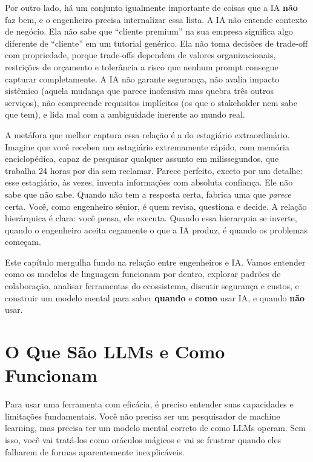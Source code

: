 Por outro lado, há um conjunto igualmente importante de coisas que a IA \textbf{não}
faz bem, e o engenheiro precisa internalizar essa lista. A IA não entende
contexto de negócio. Ela não sabe que ``cliente premium'' na sua empresa significa
algo diferente de ``cliente'' em um tutorial genérico. Ela não toma decisões de
trade-off com propriedade, porque trade-offs dependem de valores organizacionais,
restrições de orçamento e tolerância a risco que nenhum prompt consegue capturar
completamente. A IA não garante segurança, não avalia impacto sistêmico (aquela
mudança que parece inofensiva mas quebra três outros serviços), não compreende
requisitos implícitos (os que o stakeholder nem sabe que tem), e lida mal com a
ambiguidade inerente ao mundo real.

A metáfora que melhor captura essa relação é a do estagiário extraordinário. Imagine
que você recebeu um estagiário extremamente rápido, com memória enciclopédica, capaz
de pesquisar qualquer assunto em milissegundos, que trabalha 24 horas por dia sem
reclamar. Parece perfeito, exceto por um detalhe: esse estagiário, às vezes, inventa
informações com absoluta confiança. Ele não sabe que não sabe. Quando não tem a
resposta certa, fabrica uma que \textit{parece} certa. Você, como engenheiro sênior,
é quem revisa, questiona e decide. A relação hierárquica é clara: você pensa, ele
executa. Quando essa hierarquia se inverte, quando o engenheiro aceita cegamente o
que a IA produz, é quando os problemas começam.

Este capítulo mergulha fundo na relação entre engenheiros e IA. Vamos
entender como os modelos de linguagem funcionam por dentro, explorar padrões
de colaboração, analisar ferramentas do ecossistema, discutir segurança e
custos, e construir um modelo mental para saber \textbf{quando} e
\textbf{como} usar IA, e quando \textbf{não} usar.

\section{O Que São LLMs e Como Funcionam}

Para usar uma ferramenta com eficácia, é preciso entender suas capacidades
e limitações fundamentais. Você não precisa ser um pesquisador de machine
learning, mas precisa ter um modelo mental correto de como LLMs operam.
Sem isso, você vai tratá-los como oráculos mágicos e vai se frustrar
quando eles falharem de formas aparentemente inexplicáveis.

